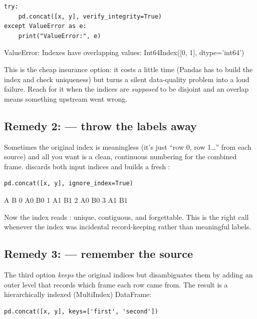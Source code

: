 \documentclass[11pt]{article}
\begin{document}
\begin{lstlisting}
try:
    pd.concat([x, y], verify_integrity=True)
except ValueError as e:
    print("ValueError:", e)
\end{lstlisting}

\begin{outblock}
ValueError: Indexes have overlapping values: Int64Index([0, 1], dtype='int64')
\end{outblock}

This is the cheap insurance option: it costs a little time (Pandas has to build the index and check uniqueness) but turns a silent data-quality problem into a loud failure. Reach for it when the indices are \emph{supposed} to be disjoint and an overlap means something upstream went wrong.

\subsection{Remedy 2: \texorpdfstring{}{ignore index} --- throw the labels away}

Sometimes the original index is meaningless (it's just ``row 0, row 1\ldots'' from each source) and all you want is a clean, continuous numbering for the combined frame.  discards both input indices and builds a fresh :

\begin{lstlisting}
pd.concat([x, y], ignore_index=True)
\end{lstlisting}

\begin{outblock}
    A   B
0  A0  B0
1  A1  B1
2  A0  B0
3  A1  B1
\end{outblock}

Now the index reads : unique, contiguous, and forgettable. This is the right call whenever the index was incidental record-keeping rather than meaningful labels.

\subsection{Remedy 3: \texorpdfstring{}{keys} --- remember the source}

The third option \emph{keeps} the original indices but disambiguates them by adding an outer level that records which frame each row came from. The result is a hierarchically indexed (MultiIndex) DataFrame:

\begin{lstlisting}
pd.concat([x, y], keys=['first', 'second'])
\end{lstlisting}
\end{document}
